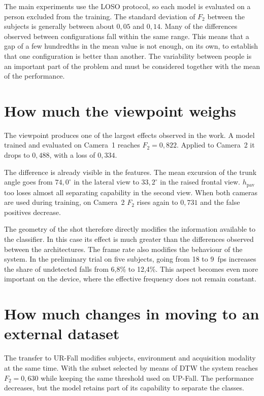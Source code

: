 The main experiments use the LOSO protocol, so each model is evaluated on a person excluded from the training.
The standard deviation of $F_2$ between the subjects is generally between about $0{,}05$ and $0{,}14$. Many of the differences observed between configurations fall within the same range. This means that a gap of a few hundredths in the mean value is not enough, on its own, to establish that one configuration is better than another. The variability between people is an important part of the problem and must be considered together with the mean of the performance.

\section{How much the viewpoint weighs}

The viewpoint produces one of the largest effects observed in the work.
A model trained and evaluated on Camera~1 reaches $F_2=0{,}822$. Applied to Camera~2 it drops to $0{,}488$, with a loss of $0{,}334$.

The difference is already visible in the features. The mean excursion of the trunk angle goes from $74{,}0^\circ$ in the lateral view to $33{,}2^\circ$ in the raised frontal view. $h_{\text{pav}}$ too loses almost all separating capability in the second view. When both cameras are used during training, on Camera~2 $F_2$ rises again to $0{,}731$ and the false positives decrease.

The geometry of the shot therefore directly modifies the information available to the classifier. In this case its effect is much greater than the differences observed between the architectures.
The frame rate also modifies the behaviour of the system. In the preliminary trial on five subjects, going from 18 to 9~fps increases the share of undetected falls from 6,8\% to 12,4\%. This aspect becomes even more important on the device, where the effective frequency does not remain constant.

\section{How much changes in moving to an external dataset}

The transfer to UR-Fall modifies subjects, environment and acquisition modality at the same time. With the subset selected by means of DTW the system reaches $F_2=0{,}630$ while keeping the same threshold used on UP-Fall. The performance decreases, but the model retains part of its capability to separate the classes.

